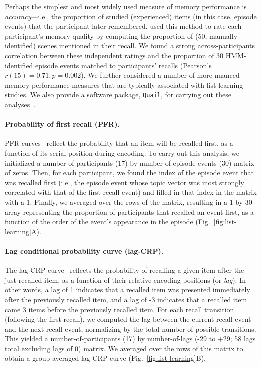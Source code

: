 \documentclass[10pt]{article}
\begin{document}
Perhaps the simplest and most widely used measure of memory performance is \textit{accuracy}---i.e., the proportion of studied (experienced) items (in this case, episode events) that the participant later remembered.  \cite{ChenEtal17} used this method to rate each participant's memory quality by computing the proportion of (50, manually identified) scenes mentioned in their recall.  We found a strong across-participants correlation between these independent ratings and the proportion of 30 HMM-identified episode events matched to participants' recalls (Pearson's $r(15) = 0.71, p = 0.002$).  We further considered a number of more nuanced memory performance measures that are typically associated with list-learning studies.  We also provide a software package, \texttt{Quail}, for carrying out these analyses~\citep{HeusEtal17b}.

\paragraph{Probability of first recall (PFR).}  PFR curves~\citep{WelcBurn24, PostPhil65, AtkiShif68} reflect the probability that an item will be recalled first, as a function of its serial position during encoding. To carry out this analysis, we initialized a number-of-participants (17) by number-of-episode-events (30) matrix of zeros. Then, for each participant, we found the index of the episode event that was recalled first (i.e., the episode event whose topic vector was most strongly correlated with that of the first recall event) and filled in that index in the matrix with a 1.  Finally, we averaged over the rows of the matrix, resulting in a 1 by 30 array representing the proportion of participants that recalled an event first, as a function of the order of the event's appearance in the episode (Fig.~\ref{fig:list-learning}A).

\paragraph{Lag conditional probability curve (lag-CRP).} The lag-CRP curve~\citep{Kaha96} reflects the probability of recalling a given item after the just-recalled item, as a function of their relative encoding positions (or \textit{lag}).  In other words, a lag of 1 indicates that a recalled item was presented immediately after the previously recalled item, and a lag of -3 indicates that a recalled item came 3 items before the previously recalled item.  For each recall transition (following the first recall), we computed the lag between the current recall event and the next recall event, normalizing by the total number of possible transitions.  This yielded a number-of-participants (17) by number-of-lags (-29 to +29; 58 lags total excluding lags of 0) matrix. We averaged over the rows of this matrix to obtain a group-averaged lag-CRP curve (Fig.~\ref{fig:list-learning}B).
\end{document}
